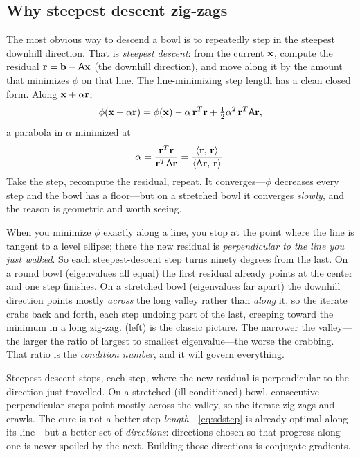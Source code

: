 \subsection{Why steepest descent zig-zags}
\label{sec:zigzag}

The most obvious way to descend a bowl is to repeatedly step in the steepest
downhill direction. That is \emph{steepest descent}: from the current $\mathbf{x}$,
compute the residual $\mathbf{r}=\mathbf{b}-\mathsf{A}\mathbf{x}$ (the downhill direction), and move
along it by the amount that minimizes $\phi$ on that line. The line-minimizing
step length has a clean closed form. Along $\mathbf{x}+\alpha\mathbf{r}$,
\[
  \phi(\mathbf{x}+\alpha\mathbf{r}) = \phi(\mathbf{x}) - \alpha\,\mathbf{r}^{T}\mathbf{r}
    + \tfrac12\alpha^2\,\mathbf{r}^{T}\mathsf{A}\mathbf{r},
\]
a parabola in $\alpha$ minimized at
\begin{equation}
\label{eq:sdstep}
  \alpha = \frac{\mathbf{r}^{T}\mathbf{r}}{\mathbf{r}^{T}\mathsf{A}\mathbf{r}}
         = \frac{\left\langle \mathbf{r},\, \mathbf{r}\right\rangle}{\left\langle \mathsf{A}\mathbf{r},\, \mathbf{r}\right\rangle} .
\end{equation}
Take the step, recompute the residual, repeat. It converges---$\phi$ decreases
every step and the bowl has a floor---but on a stretched bowl it converges
\emph{slowly}, and the reason is geometric and worth seeing.

When you minimize $\phi$ exactly along a line, you stop at the point where the
line is tangent to a level ellipse; there the new residual is
\emph{perpendicular to the line you just walked}. So each steepest-descent step
turns ninety degrees from the last. On a round bowl (eigenvalues all equal) the
first residual already points at the center and one step finishes. On a stretched
bowl (eigenvalues far apart) the downhill direction points mostly \emph{across}
the long valley rather than \emph{along} it, so the iterate crabs back and forth,
each step undoing part of the last, creeping toward the minimum in a long
zig-zag.  (left) is the classic picture. The narrower the
valley---the larger the ratio of largest to smallest eigenvalue---the worse the
crabbing. That ratio is the \emph{condition number}, and it will govern
everything.

\begin{keyidea}
Steepest descent stops, each step, where the new residual is perpendicular to the
direction just travelled. On a stretched (ill-conditioned) bowl, consecutive
perpendicular steps point mostly across the valley, so the iterate zig-zags and
crawls. The cure is not a better step \emph{length}---\cref{eq:sdstep} is already
optimal along its line---but a better set of \emph{directions}: directions chosen
so that progress along one is never spoiled by the next. Building those
directions is conjugate gradients.
\end{keyidea}

